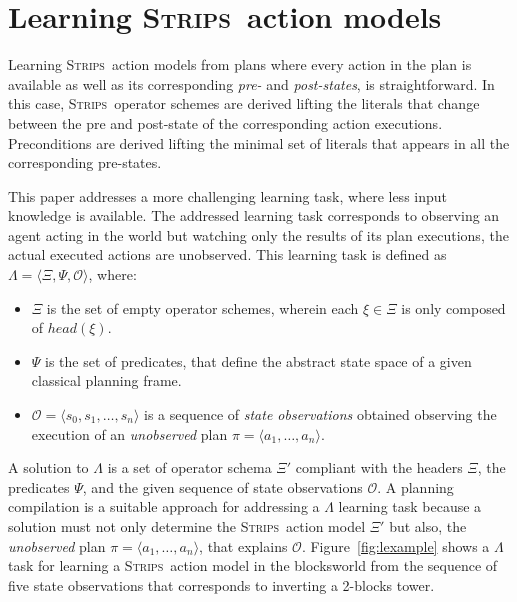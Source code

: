 \documentclass{article}
\newcommand{\tup}[1]{{\langle #1 \rangle}}
\newcommand{\strips}{\textsc{Strips}}     %
\begin{document}
\section{Learning \strips\ action models}
Learning \strips\ action models from plans where every action in the plan is available as well as its corresponding {\em pre-} and {\em post-states}, is straightforward. In this case, \strips\ operator schemes are derived lifting the literals that change between the pre and post-state of the corresponding action executions. Preconditions are derived lifting the minimal set of literals that appears in all the corresponding pre-states.

This paper addresses a more challenging learning task, where less input knowledge is available. The addressed learning task corresponds to observing an agent acting in the world but watching only the results of its plan executions, the actual executed actions are unobserved. This learning task is defined as $\Lambda=\tup{\Xi,\Psi,\mathcal{O}}$, where:
\begin{itemize}
\item $\Xi$ is the set of empty operator schemes, wherein each $\xi\in\Xi$ is only composed of $head(\xi)$.
\item $\Psi$ is the set of predicates, that define the abstract state space of a given classical planning frame.
\item $\mathcal{O}=\tup{s_0,s_1,\ldots,s_{n}}$ is a sequence of {\em state observations} obtained observing the execution of an {\em unobserved} plan $\pi=\tup{a_1, \ldots, a_n}$.
\end{itemize}

A solution to $\Lambda$ is a set of operator schema $\Xi'$ compliant with the headers $\Xi$, the predicates $\Psi$, and the given sequence of state observations $\mathcal{O}$. A planning compilation is a suitable approach for addressing a $\Lambda$ learning task because a solution must not only determine the \strips\ action model $\Xi'$ but also, the {\em unobserved} plan $\pi=\tup{a_1, \ldots, a_n}$, that explains $\mathcal{O}$. Figure~\ref{fig:lexample} shows a $\Lambda$ task for learning a \strips\ action model in the blocksworld from the sequence of five state observations that corresponds to inverting a 2-blocks tower.
\end{document}
